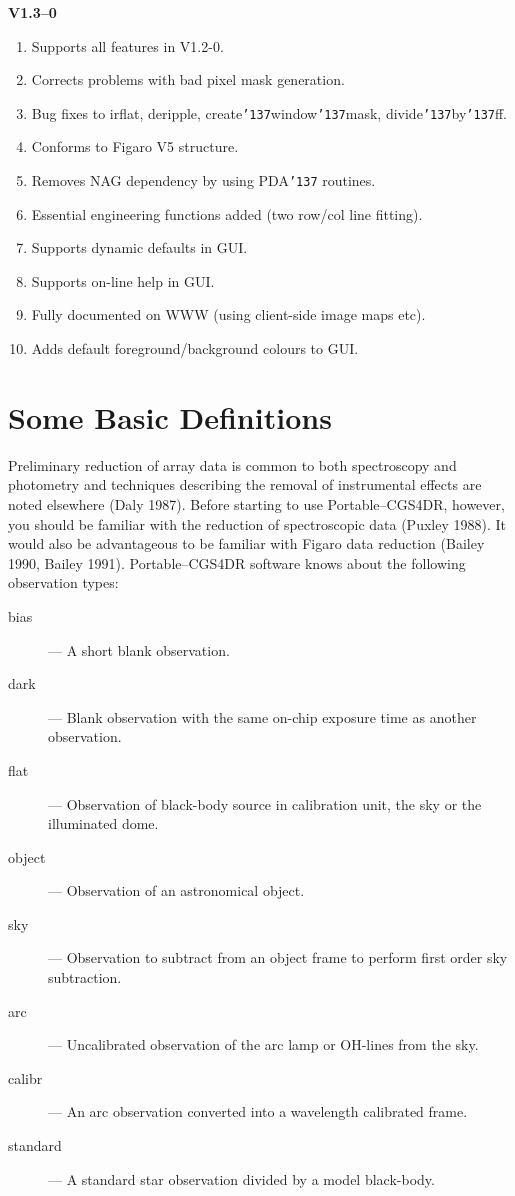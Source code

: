 \documentclass[a4paper]{book}
\renewcommand{\_}{{\tt\char'137}}
\begin{document}
\begin{description}
\begin{enumerate}
 \end{enumerate}
\item[] {\bf V1.3--0}
 \begin{enumerate}
  \item Supports all features in V1.2-0.
  \item Corrects problems with bad pixel mask generation.
  \item Bug fixes to irflat, deripple, create\_window\_mask, divide\_by\_ff.
  \item Conforms to Figaro V5 structure.
  \item Removes NAG dependency by using PDA\_ routines.
  \item Essential engineering functions added (two row/col line fitting).
  \item Supports dynamic defaults in GUI.
  \item Supports on-line help in GUI.
  \item Fully documented on WWW (using client-side image maps etc).
  \item Adds default foreground/background colours to GUI.
 \end{enumerate}
\end{description}

\section{Some Basic Definitions}
Preliminary reduction of array data is common to both spectroscopy and
photometry and techniques describing the removal of instrumental
effects are noted elsewhere (Daly 1987). Before starting to use
Portable--CGS4DR, however, you should be familiar with the reduction of
spectroscopic data (Puxley 1988).  It would also be advantageous to be
familiar with Figaro data reduction (Bailey 1990, Bailey 1991).
Portable--CGS4DR software knows about the following observation types:

\begin{description}
\item[{\sc bias}]--- A short blank observation.
\item[{\sc dark}]--- Blank observation with the same on-chip exposure time as
 another observation.
\item[{\sc flat}]--- Observation of black-body source in calibration unit,
 the sky or the illuminated dome.
\item[{\sc object}]--- Observation of an astronomical object.
\item[{\sc sky}]--- Observation to subtract from an {\sc object} frame to
 perform first order sky subtraction.
\item[{\sc arc}]--- Uncalibrated observation of the arc lamp or OH-lines from
 the sky.
\item[{\sc calibr}]--- An {\sc arc} observation converted into a wavelength
 calibrated frame.
\item[{\sc standard}]--- A standard star observation divided by a model
 black-body.
\end{description}
\end{document}
